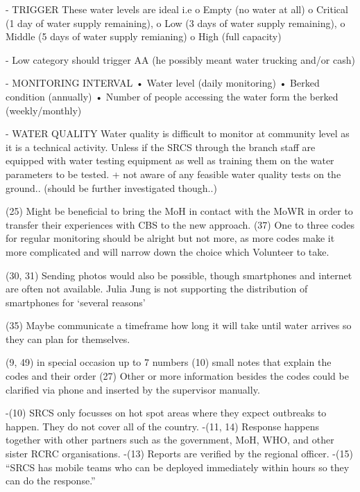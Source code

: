 - TRIGGER
These water levels are ideal i.e 
o	Empty (no water at all) 
o	Critical (1 day of water supply remaining), 
o	Low (3 days of water supply remaining), 
o	Middle (5 days of water supply remianing) 
o	High (full capacity)

-	Low category should trigger AA (he possibly meant water trucking and/or cash)

- MONITORING INTERVAL
•	Water level (daily monitoring)
•	Berked condition (annually)
•	Number of people accessing the water form the berked (weekly/monthly)

- WATER QUALITY
Water quality is difficult to monitor at community level as it is a technical activity. Unless if the SRCS through the branch staff are equipped with water testing equipment as well as training them on the water parameters to be tested.
+ not aware of any feasible water quality tests on the ground.. (should be further investigated though..)





(25) Might be beneficial to bring the MoH in contact with the MoWR in order to transfer their experiences with CBS to the new approach.
(37) One to three codes for regular monitoring should be alright but not more, as more codes make it more complicated and will narrow down the choice which Volunteer to take. 

(30, 31) Sending photos would also be possible, though smartphones and internet are often not available. Julia Jung is not supporting the distribution of smartphones for ‘several reasons’

(35) Maybe communicate a timeframe how long it will take until water arrives so they can plan for themselves.

(9, 49) in special occasion up to 7 numbers
(10) small notes that explain the codes and their order
(27) Other or more information besides the codes could be clarified via phone and inserted by the supervisor manually.

-(10) SRCS only focusses on hot spot areas where they expect outbreaks to happen. They do not cover all of the country.
-(11, 14) Response happens together with other partners such as the government, MoH, WHO, and other sister RCRC organisations.
-(13) Reports are verified by the regional officer.
-(15) “SRCS has mobile teams who can be deployed immediately within hours so they can do the response.”

